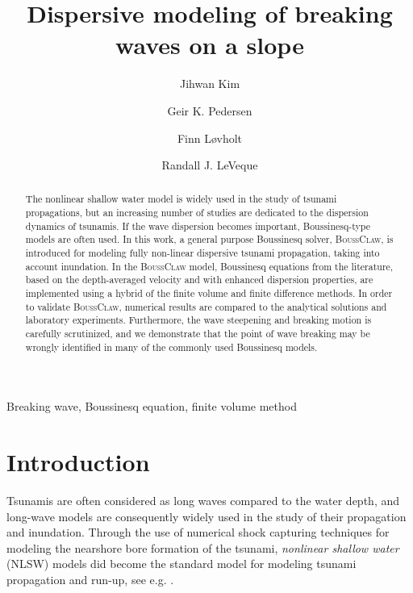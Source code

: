 \documentclass[review]{elsarticle}
\newcommand{\BoussClaw}{\textsc{BoussClaw} }
\newcommand{\BoussClawt}{\textsc{BoussClaw}}
\begin{document}
\begin{frontmatter}

\title{Dispersive modeling of breaking waves  on a slope}

\author[1]{Jihwan Kim}
\author[1]{Geir K. Pedersen}
\author[1,2]{Finn L{\o}vholt}
\author[3]{Randall J. LeVeque}

\address[1]{University of Oslo, Department of Mathematics, 
Oslo, Norway}
\address[2]{Norwegian Geotechnical Institute,
Oslo, Norway}
\address[3]{University of Washington, Department of Applied Mathematics, Seattle, USA}

\begin{abstract}

The nonlinear shallow water model is widely used
in the study of tsunami propagations,
but an increasing number of studies 
are dedicated to the dispersion dynamics of tsunamis.
If the wave dispersion becomes important,
Boussinesq-type models are often used. 
In this work, a general purpose Boussinesq solver, 
\BoussClawt, is introduced
for modeling fully non-linear dispersive tsunami propagation, 
taking into account inundation. 
In the \BoussClaw model,
Boussinesq equations from the literature, 
based on the depth-averaged velocity 
and with enhanced dispersion properties, 
are implemented using a hybrid of the finite volume
and finite difference methods.
In order to validate \BoussClawt, 
numerical results are compared 
to the analytical solutions and laboratory experiments. 
Furthermore, the  wave steepening and breaking motion
is carefully scrutinized, 
and we demonstrate that the point of wave breaking
may be wrongly identified  in many of the commonly used Boussinesq models. 

\end{abstract}

\begin{keyword}
Breaking wave, Boussinesq equation, finite volume method
\end{keyword}

\end{frontmatter}

\linenumbers

\section{Introduction}

Tsunamis are often considered as long waves compared to the water depth, and 
long-wave models are consequently widely used in the study of their propagation and inundation.
Through the use of numerical shock capturing techniques for modeling
the nearshore bore formation of the tsunami, {\em nonlinear shallow water} (NLSW) models
did become the standard model for modeling tsunami propagation and run-up, see e.g. 
\citep{titov1995modeling,Imamura1996b,Harig2008,BergerGeorgeLeVequeMandli11}.
\end{document}
